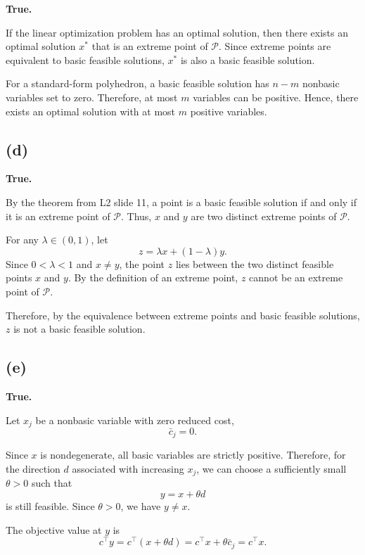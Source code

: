 \documentclass{article}
\begin{document}
\textbf{True.}

If the linear optimization problem has an optimal solution, then there
exists an optimal solution $x^*$ that is an extreme point of $\mathcal{P}$.
Since extreme points are equivalent to basic feasible solutions, $x^*$ is
also a basic feasible solution.

For a standard-form polyhedron, a basic feasible solution has $n-m$
nonbasic variables set to zero. Therefore, at most $m$ variables can be
positive. Hence, there exists an optimal solution with at most $m$ positive
variables.


\vspace{5mm}

\subsection*{(d)}
\textbf{True.}

By the theorem from L2 slide 11, a point is a basic feasible solution if and only if it is an extreme point of $\mathcal{P}$. Thus, $x$ and $y$ are
two distinct extreme points of $\mathcal{P}$.

For any $\lambda \in (0,1)$, let
\[
z=\lambda x+(1-\lambda)y.
\]
Since $0<\lambda<1$ and $x\neq y$, the point $z$ lies between the two
distinct feasible points $x$ and $y$. By the definition of an extreme
point, $z$ cannot be an extreme point of $\mathcal{P}$.

Therefore, by the equivalence between extreme points and basic feasible
solutions, $z$ is not a basic feasible solution.





\vspace{5mm}
\subsection*{(e)}

\textbf{True.}

Let $x_j$ be a nonbasic variable with zero reduced cost,
\[
\bar c_j=0.
\]

Since $x$ is nondegenerate, all basic variables are strictly positive.
Therefore, for the direction $d$ associated with increasing $x_j$, we can
choose a sufficiently small $\theta>0$ such that
\[
y=x+\theta d
\]
is still feasible. Since $\theta>0$, we have $y\neq x$.

The objective value at $y$ is
\[
c^\top y
= c^\top(x+\theta d)
= c^\top x+\theta \bar c_j
= c^\top x.
\]
\end{document}
